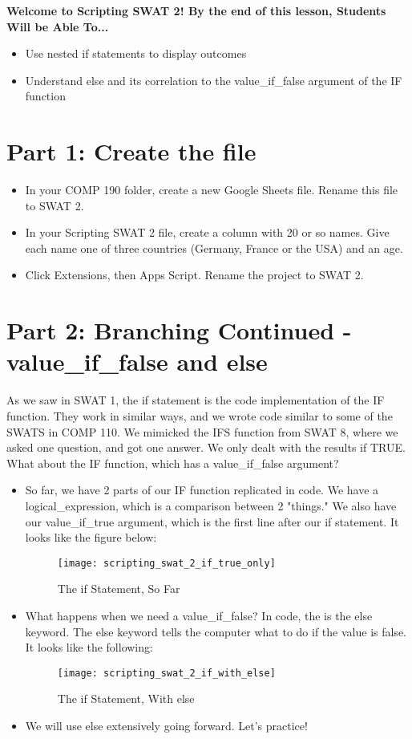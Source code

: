 \documentclass{article}
\newcommand{\AName}{Scripting SWAT 2}
\begin{document}
\textbf{Welcome to \AName!  By the end of this lesson, Students Will be Able To...}
\begin{itemize}
    \item Use nested if statements to display outcomes
    \item Understand else and its correlation to the value\_if\_false argument of the IF function
\end{itemize}


\section*{Part 1: Create the file}
\begin{itemize}
    \item In your COMP 190 folder, create a new Google Sheets file.  Rename this file to SWAT 2.
    \item In your Scripting SWAT 2 file, create a column with 20 or so names.  Give each name one of three countries (Germany, France or the USA) and an age.
    \item Click Extensions, then Apps Script.  Rename the project to SWAT 2.
\end{itemize}

\section*{Part 2: Branching Continued - value\_if\_false and else}
As we saw in SWAT 1, the if statement is the code implementation of the IF function.  They work in similar ways, and we wrote code similar to some of the SWATS in COMP 110.  We mimicked the IFS function from SWAT 8, where we asked one question, and got one answer.  We only dealt with the results if TRUE.  What about the IF function, which has a value\_if\_false argument?
\begin{itemize}
	\item  So far, we have 2 parts of our IF function replicated in code.  We have a logical\_expression, which is a comparison between 2 "things."  We also have our value\_if\_true argument, which is the first line after our if statement.  It looks like the figure below:
	\begin{figure}[H]
  \centering
  \texttt{[image: scripting\_swat\_2\_if\_true\_only]}
  \caption{The if Statement, So Far}
\end{figure}
	\item What happens when we need a value\_if\_false?  In code, the is the else keyword.  The else keyword tells the computer what to do if the value is false.  It looks like the following:
	\begin{figure}[H]
  \centering
  \texttt{[image: scripting\_swat\_2\_if\_with\_else]}
  \caption{The if Statement, With else}
\end{figure}
	\item We will use else extensively going forward.  Let's practice!
\end{itemize}
\end{document}

